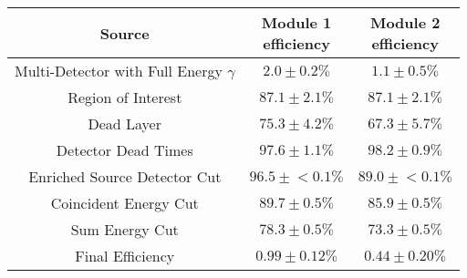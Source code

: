 \begin{tabular}{|c|c|c|}
\hline
  Source & \makecell{Module 1\\efficiency} & \makecell{Module 2\\efficiency} \\
\hline
  \makecell{Multi-Detector with\\Full Energy $\gamma$} & $2.0 \pm 0.2\%$ & $1.1 \pm 0.5\%$ \\
  Region of Interest & $87.1 \pm 2.1\%$ & $87.1 \pm 2.1\%$ \\
  Dead Layer & $75.3 \pm 4.2\%$ & $67.3 \pm 5.7\%$ \\
  Detector Dead Times & $97.6 \pm 1.1\%$ & $98.2 \pm 0.9\%$ \\
  Enriched Source Detector Cut & $96.5 \pm{}<\!0.1\%$ & $89.0 \pm{}<\!0.1\%$ \\
  Coincident Energy Cut & $89.7 \pm 0.5\%$ & $85.9 \pm 0.5\%$ \\
  Sum Energy Cut & $78.3 \pm 0.5\%$ & $73.3 \pm 0.5\%$ \\
  \hline Final Efficiency & $0.99 \pm 0.12\%$ & $0.44 \pm 0.20\%$ \\
\hline
\end{tabular}
